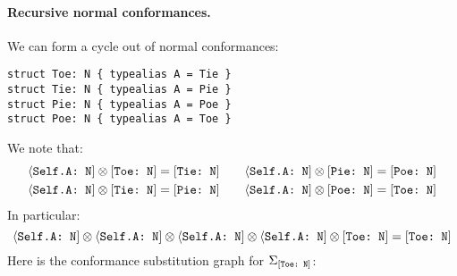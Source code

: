 \documentclass[../generics]{subfiles}
\begin{document}
\paragraph{Recursive normal conformances.} We can form a cycle out of normal conformances:
\begin{Verbatim}
struct Toe: N { typealias A = Tie }
struct Tie: N { typealias A = Pie }
struct Pie: N { typealias A = Poe }
struct Poe: N { typealias A = Toe }
\end{Verbatim}
We note that:
\begin{gather*}
\langle\texttt{Self.A:~N}] \otimes [\texttt{Toe:~N}] = [\texttt{Tie:~N}]\qquad\langle\texttt{Self.A:~N}] \otimes [\texttt{Pie:~N}] = [\texttt{Poe:~N}]\\
\langle\texttt{Self.A:~N}] \otimes [\texttt{Tie:~N}] = [\texttt{Pie:~N}]\qquad\langle\texttt{Self.A:~N}] \otimes [\texttt{Poe:~N}] = [\texttt{Toe:~N}]
\end{gather*}
In particular:
\[
\langle\texttt{Self.A:~N}] \otimes \langle\texttt{Self.A:~N}] \otimes \langle\texttt{Self.A:~N}] \otimes \langle\texttt{Self.A:~N}] \otimes [\texttt{Toe:~N}] = [\texttt{Toe:~N}]
\]
Here is the conformance substitution graph for $\Sigma_{[\texttt{Toe:~N}]}$:
\begin{center}
\end{center}
\end{document}
